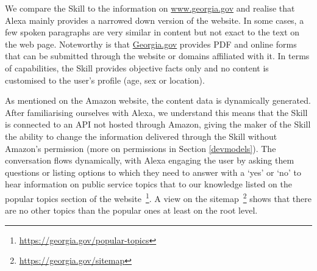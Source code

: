 




We compare the Skill to the information on \url{www.georgia.gov} and realise that Alexa mainly provides a narrowed down version of the website. In some cases, a few spoken paragraphs are very similar in content but not exact to the text on the web page. Noteworthy is that \href{www.georgia.gov}{Georgia.gov} provides PDF and online forms that can be submitted through the website or domains affiliated with it. In terms of capabilities, the Skill provides objective facts only and no content is customised to the user's profile (age, sex or location). 



As mentioned on the Amazon website, the content data is dynamically generated. After familiarising ourselves with Alexa, we understand this means that the Skill is connected to an API not hosted through Amazon, giving the maker of the Skill the ability to change the information delivered through the Skill without Amazon's permission (more on permissions in Section \ref{devmodels}).%
The conversation flows dynamically, with Alexa engaging the user by asking them questions or listing options to which they need to answer with a `yes' or `no' to hear information on public service topics that to our knowledge listed on the popular topics section of the website~\footnote{\url{https://georgia.gov/popular-topics}}. A view on the sitemap~\footnote{\url{https://georgia.gov/sitemap}} shows that there are no other topics than the popular ones at least on the root level.





